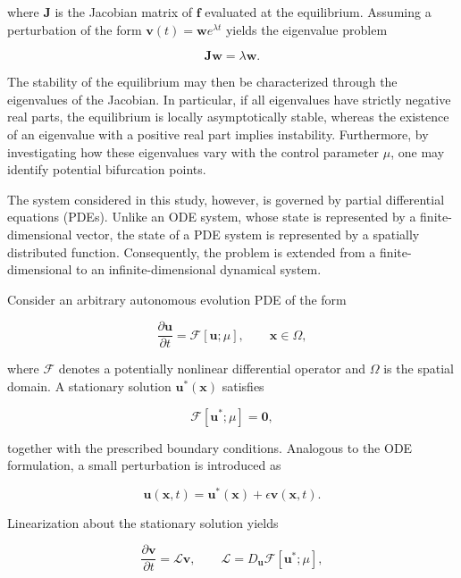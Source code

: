 \documentclass[11pt]{article}
\begin{document}
where $\bm{J}$ is the Jacobian matrix of $\bm{f}$
evaluated at the equilibrium. Assuming a perturbation
of the form $\bm{v}(t)=\bm{w}e^{\lambda t}$ yields
the eigenvalue problem

\begin{equation}
    \bm{J}\bm{w}=\lambda\bm{w}.
\end{equation}

The stability of the equilibrium may then be
characterized through the eigenvalues of the Jacobian.
In particular, if all eigenvalues have strictly negative
real parts, the equilibrium is locally asymptotically
stable, whereas the existence of an eigenvalue with
a positive real part implies instability. Furthermore,
by investigating how these eigenvalues vary with the
control parameter $\mu$, one may identify potential
bifurcation points.

\medskip

The system considered in this study, however, is
governed by partial differential equations (PDEs).
Unlike an ODE system, whose state is represented by
a finite-dimensional vector, the state of a PDE
system is represented by a spatially distributed
function. Consequently, the problem is extended from
a finite-dimensional to an infinite-dimensional
dynamical system.

Consider an arbitrary autonomous evolution PDE
of the form

\begin{equation}
    \frac{\partial\bm{u}}{\partial t}
    =\mathcal{F}[\bm{u};\mu],
    \qquad \bm{x}\in\Omega,
\end{equation}

where $\mathcal{F}$ denotes a potentially nonlinear
differential operator and $\Omega$ is the spatial
domain. A stationary solution $\bm{u}^*(\bm{x})$
satisfies

\begin{equation}
    \mathcal{F}[\bm{u}^*;\mu]=\bm{0},
\end{equation}

together with the prescribed boundary conditions.
Analogous to the ODE formulation, a small perturbation
is introduced as

\begin{equation}
    \bm{u}(\bm{x},t)
    =\bm{u}^*(\bm{x})+\epsilon\bm{v}(\bm{x},t).
\end{equation}

Linearization about the stationary solution yields

\begin{equation}
    \frac{\partial\bm{v}}{\partial t}
    =\mathcal{L}\bm{v},
    \qquad
    \mathcal{L}=D_{\bm{u}}\mathcal{F}[\bm{u}^*;\mu],
\end{equation}
\end{document}
